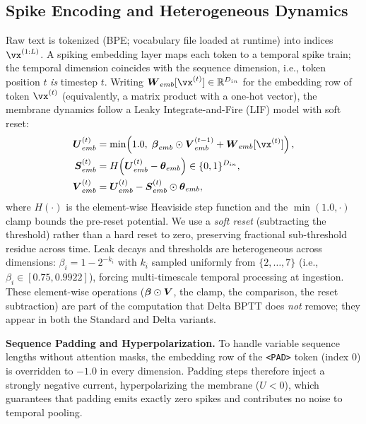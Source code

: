 \documentclass[10pt,journal,compsoc]{IEEEtran}
\begin{document}
\subsection{Spike Encoding and Heterogeneous Dynamics}
Raw text is tokenized (BPE; vocabulary file loaded at runtime) into indices $\vx^{(1:L)}$. A spiking embedding layer maps each token to a temporal spike train; the temporal dimension coincides with the sequence dimension, i.e., token position $t$ \emph{is} timestep $t$. Writing $\mW_{emb}[\vx^{(t)}] \in \mathbb{R}^{D_{in}}$ for the embedding row of token $\vx^{(t)}$ (equivalently, a matrix product with a one-hot vector), the membrane dynamics follow a Leaky Integrate-and-Fire (LIF) model with soft reset:
\begin{align}
\mU_{emb}^{(t)} &= \min\!\left(1.0,\; \bm{\beta}_{emb} \odot \mV_{emb}^{(t-1)} + \mW_{emb}[\vx^{(t)}]\right), \label{eq:lif_u}\\
\mS_{emb}^{(t)} &= H\!\left(\mU_{emb}^{(t)} - \bm{\theta}_{emb}\right) \in \{0,1\}^{D_{in}}, \label{eq:lif_s}\\
\mV_{emb}^{(t)} &= \mU_{emb}^{(t)} - \mS_{emb}^{(t)} \odot \bm{\theta}_{emb}, \label{eq:lif_v}
\end{align}
where $H(\cdot)$ is the element-wise Heaviside step function and the $\min(1.0,\cdot)$ clamp bounds the pre-reset potential. We use a \emph{soft reset} (subtracting the threshold) rather than a hard reset to zero, preserving fractional sub-threshold residue across time. Leak decays and thresholds are heterogeneous across dimensions: $\beta_i = 1 - 2^{-k_i}$ with $k_i$ sampled uniformly from $\{2,\dots,7\}$ (i.e., $\beta_i \in [0.75, 0.9922]$), forcing multi-timescale temporal processing at ingestion. These element-wise operations ($\boldsymbol{\beta}\odot\boldsymbol{V}$, the clamp, the comparison, the reset subtraction) are part of the computation that Delta BPTT does \emph{not} remove; they appear in both the Standard and Delta variants.

\textbf{Sequence Padding and Hyperpolarization.} To handle variable sequence lengths without attention masks, the embedding row of the \texttt{<PAD>} token (index $0$) is overridden to $-1.0$ in every dimension. Padding steps therefore inject a strongly negative current, hyperpolarizing the membrane ($U < 0$), which guarantees that padding emits exactly zero spikes and contributes no noise to temporal pooling.
\end{document}
